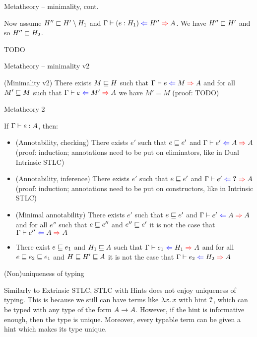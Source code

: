 \documentclass{beamer}
\begin{document}
\begin{frame}{Metatheory -- minimality, cont.}

Now assume $H'' \sqsubset H' \setminus H_1$ and $\hinting{\annot{e}{H_1}}{H''}{A}$. We have $H'' \sqsubset H'$ and so $H'' \sqsubset H_2$.

\vspace{2em}

TODO

\end{frame}

\begin{frame}{Metatheory -- minimality v2}

(Minimality v2) There exists $M \sqsubseteq H$ such that $\hinting[\Gamma]{e}{M}{A}$ and for all $M' \sqsubseteq M$ such that $\hinting[\Gamma]{e}{M'}{A}$ we have $M' = M$ (proof: TODO)

\vspace{1em}

\end{frame}

\begin{frame}{Metatheory 2}

If $\typing[\Gamma]{e}{A}$, then:

\begin{itemize}
  \item (Annotability, checking) There exists $e'$ such that $e \sqsubseteq e'$ and $\hinting[\Gamma]{e'}{A}{A}$ (proof: induction; annotations need to be put on eliminators, like in Dual Intrinsic STLC)
  \item (Annotability, inference) There exists $e'$ such that $e \sqsubseteq e'$ and $\hinting[\Gamma]{e'}{\Hole}{A}$ (proof: induction; annotations need to be put on constructors, like in Intrinsic STLC)
  \item (Minimal annotability) There exists $e'$ such that $e \sqsubseteq e'$ and $\hinting[\Gamma]{e'}{A}{A}$ and for all $e''$ such that $e \sqsubseteq e''$ and $e'' \sqsubseteq e'$ it is not the case that $\hinting[\Gamma]{e''}{A}{A}$
  \item There exist $e \sqsubseteq e_1$ and $H_1 \sqsubseteq A$ such that $\hinting[\Gamma]{e_1}{H_1}{A}$ and for all $e \sqsubseteq e_2 \sqsubseteq e_1$ and $H \sqsubseteq H' \sqsubseteq A$ it is not the case that $\hinting[\Gamma]{e_2}{H_2}{A}$
\end{itemize}

\end{frame}

\begin{frame}{(Non)uniqueness of typing}

Similarly to Extrinsic STLC, STLC with Hints does not enjoy uniqueness of typing. This is because we still can have terms like $\fun{x}{x}$ with hint $\textbf{?}$, which can be typed with any type of the form $A \to A$. However, if the hint is informative enough, then the type is unique. Moreover, every typable term can be given a hint which makes its type unique.

\end{frame}
\end{document}
